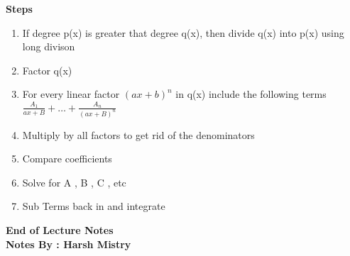 \documentclass{article}
\begin{document}
\textbf{Steps}
\begin{enumerate}
\item If degree p(x) is greater that degree q(x), then divide q(x) into p(x) using long divison
\item Factor q(x)
\item For every linear factor \( (ax+b)^ n\)  in q(x) include the following terms \( \frac{A_1}{ax+B} + \ldots + \frac{A_n}{(ax+B)^n} \)
\item Multiply by all factors to get rid of the denominators 
\item Compare coefficients
\item Solve for A , B , C , etc 
\item Sub Terms back in and integrate
\end{enumerate}



\begin{center}
\textbf{End of Lecture Notes} \\
\textbf{Notes By : Harsh Mistry}
\end{center}
\end{document}
